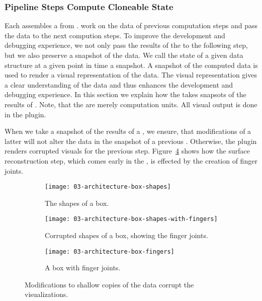 \documentclass[../ClassicThesis.tex]{subfiles}
\begin{document}
\paragraph{}


\subsubsection{Pipeline Steps Compute Cloneable State}

Each \class{\fabmethod} assembles a  from
.  work on the
data of previous computation steps and pass the data to the
next compution steps. To improve the development and
debugging experience, we not only pass the results of the
 to the following step, but we also
preserve a snapshot of the data. We call the state of a
given data structure at a given point in time a snapshot. A
snapshot of the computed data is used to render a visual
representation of the data. The visual representation gives
a clear understanding of the data and thus enhances the
development and debugging experience. In this section we
explain how the  takes snapsots of the
results of . Note, that the
 are merely computation units. All
visual output is done in the  plugin.

When we take a snapshot of the results of a
, we ensure, that modifications of a
latter  will not alter the data in the
snapshot of a previous . Otherwise, the
 plugin renders corrupted visuals for
the previous step. Figure~\ref{fig:corrupt} shows how the surface
reconstruction step, which comes early in the
, is effected by the creation of finger
joints.

\begin{figure}[h]
  \centering
  \begin{subfigure}[a]{0.3222\textwidth}
    \texttt{[image: 03-architecture-box-shapes]}
    \caption{The shapes of a box.}
    \label{fig:corrupt:shapes}
  \end{subfigure}
  \begin{subfigure}[b]{0.3222\textwidth}
    \texttt{[image: 03-architecture-box-shapes-with-fingers]}
    \caption{Corrupted shapes of a box, showing the finger joints.}
    \label{fig:corrupt:shapes-fingers}
  \end{subfigure}
  \begin{subfigure}[c]{0.3222\textwidth}
    \texttt{[image: 03-architecture-box-fingers]}
    \caption{A box with finger joints.}
    \label{fig:corrupt:fingers}
  \end{subfigure}
  \caption{Modifications to shallow copies of the data
    corrupt the visualizations.}
  \label{fig:corrupt}
\end{figure}
\end{document}

